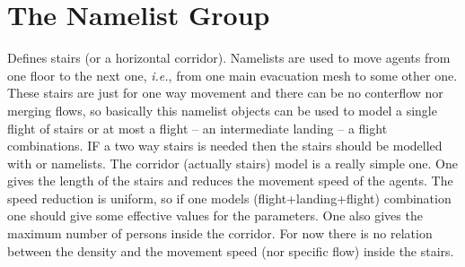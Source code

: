 \documentclass[12pt,a4paper,final,twoside]{stylevk}
\begin{document}
\section{The  Namelist Group}\label{Sec_CorrNML}

\noindent Defines stairs (or a horizontal corridor).  Namelists
 are used to move agents from one floor to the next one,
\emph{i.e.}, from one main evacuation mesh to some other one.  These
stairs are just for one way movement and there can be no conterflow
nor merging flows, so basically this namelist objects can be used to
model a single flight of stairs or at most a flight -- an intermediate
landing -- a flight combinations.  IF a two way stairs is needed then
the stairs should be modelled with  or 
namelists.  The corridor (actually stairs) model is a really simple
one.  One gives the length of the stairs and reduces the movement
speed of the agents.  The speed reduction is uniform, so if one models
(flight+landing+flight) combination one should give some effective
values for the parameters.  One also gives the maximum number of
persons inside the corridor.  For now there is no relation between the
density and the movement speed (nor specific flow) inside the stairs.
\end{document}
